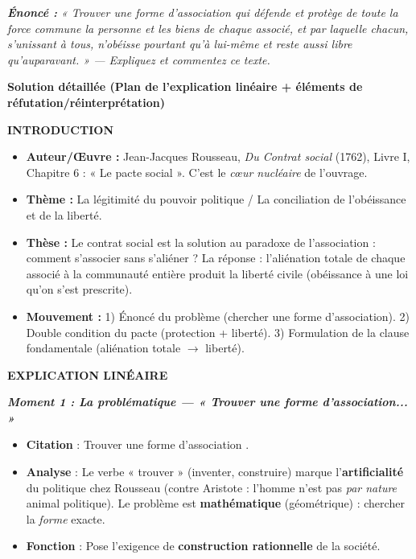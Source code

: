 \documentclass[11pt]{article}
\begin{document}
\begin{exoresolu}
\emph{\textbf{Énoncé :} « Trouver une forme d'association qui défende et protège de toute la force commune la personne et les biens de chaque associé, et par laquelle chacun, s'unissant à tous, n'obéisse pourtant qu'à lui-même et reste aussi libre qu'auparavant. » — Expliquez et commentez ce texte.}

\medskip
\noindent\textbf{Solution détaillée (Plan de l'explication linéaire + éléments de réfutation/réinterprétation)}

\medskip
\noindent\textbf{INTRODUCTION}
\begin{itemize}
    \item \textbf{Auteur/Œuvre :} Jean-Jacques Rousseau, \emph{Du Contrat social} (1762), Livre I, Chapitre 6 : « Le pacte social ». C'est le \emph{cœur nucléaire} de l'ouvrage.
    \item \textbf{Thème :} La légitimité du pouvoir politique / La conciliation de l'obéissance et de la liberté.
    \item \textbf{Thèse :} Le contrat social est la solution au paradoxe de l'association : comment s'associer sans s'aliéner ? La réponse : l'aliénation totale de chaque associé à la communauté entière produit la liberté civile (obéissance à une loi qu'on s'est prescrite).
    \item \textbf{Mouvement :} 1) Énoncé du problème (chercher une forme d'association). 2) Double condition du pacte (protection + liberté). 3) Formulation de la clause fondamentale (aliénation totale $\rightarrow$ liberté).
\end{itemize}

\medskip
\noindent\textbf{EXPLICATION LINÉAIRE}

\emph{\textbf{Moment 1 : La problématique — « Trouver une forme d'association... »}}
\begin{itemize}
    \item \textbf{Citation} : \guillemotleft Trouver une forme d'association \guillemotright.
    \item \textbf{Analyse} : Le verbe « trouver » (inventer, construire) marque l'\textbf{artificialité} du politique chez Rousseau (contre Aristote : l'homme n'est pas \emph{par nature} animal politique). Le problème est \textbf{mathématique} (géométrique) : chercher la \emph{forme} exacte.
    \item \textbf{Fonction} : Pose l'exigence de \textbf{construction rationnelle} de la société.
\end{itemize}


\end{exoresolu}
\end{document}
